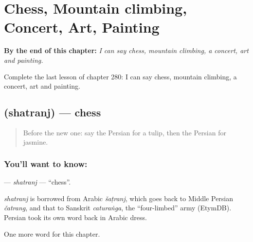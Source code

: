 
\chapter{Chess, Mountain climbing, Concert, Art, Painting}
\label{ch:fa-chess-mountain-climbing-concert-art-painting}

\begin{chapteropening}
\textbf{By the end of this chapter:} \emph{I can say chess, mountain climbing, a concert, art and painting.}

Complete the last lesson of chapter 280: I can say chess, mountain climbing, a concert, art and painting.
\end{chapteropening}

\section[\texorpdfstring{\fa{شطرنج} (shatranj)}{شطرنج (shatranj)}]{ (shatranj) — chess}

\label{lesson:FA-C280-shatranj}



\begin{quote}
Before the new one: say the Persian for a tulip, then the Persian for jasmine.
\end{quote}

\subsection*{You'll want to know: }
\textbf{} — \emph{shatranj} — \textquotedblleft{}chess\textquotedblright{}.

\begin{cousinweb}
\emph{shatranj} is borrowed from Arabic \emph{šaṭranj}, which goes back to Middle Persian \emph{čatrang}, and that to Sanskrit \emph{caturaṅga}, the \textquotedblleft{}four-limbed\textquotedblright{} army (EtymDB). Persian took its own word back in Arabic dress.
\end{cousinweb}

\begin{grammarlens}[title={What you've built}]
One more word for this chapter.
\end{grammarlens}

